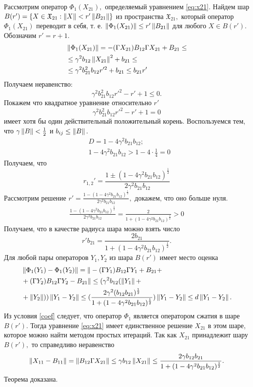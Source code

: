 Рассмотрим оператор $\Phi_1(X_{21}),$ определяемый уравнением \eqref{eq:x21}. Найдем шар $B(r') = \{ X \in  \mathfrak{X}_{21}: \left\|X\right\| < r' \left\|B_{21}\right\| \}$ из пространства $ \mathfrak{X}_{21},$ который оператор $\Phi_1(X_{21})$ переводит в себя, т.\! е. $\left\|\Phi_1(X_{21})\right\| \leq r' \left\|B_{21}\right\|$ для любого $X \in B(r').$ Обозначим $r' = r + 1.$
\begin{align*}
&\left\|\Phi_1(X_{21})\right\| = - (\Gamma X_{21})B_{12}\Gamma X_{21} + B_{21} \leq \\
&\leq \gamma^2 b_{12}\left\|X_{21}\right\|^2 + b_{21} \leq \\ 
&\leq \gamma^2 b_{21}^2 b_{12}r'^2 + b_{21} \leq b_{21}r'
\end{align*}
Получаем неравенство:
$$
\gamma^2 b_{21}^2 b_{12}r'^2 - r' + 1 \leq 0.
$$
Покажем что квадратное уравнение относительно $r'$
$$
\gamma^2 b_{21}^2 b_{12}r'^2 - r' + 1 = 0
$$
имеет хотя бы один действительный положительный корень. Воспользуемся тем, что $\gamma\left\|B\right\| < \frac{1}{2}$ и $b_{ij} \leq \left\|B\right\|.$
\begin{align*}
&D = 1 - 4\gamma^2 b_{21}b_{12}; \\
&1 - 4\gamma^2 b_{21}b_{12} > 1 - 4\cdot\frac{1}{4} = 0
\end{align*}
Получаем, что 
$$
	r_{1,2}' = \frac{1 \pm (1 - 4\gamma^2 b_{21}b_{12})^{\frac{1}{2}}}{2\gamma^2 b_{21}b_{12}}
$$	
Рассмотрим решение $r' = \frac{1 - (1 - 4\gamma^2 b_{21}b_{12})^{\frac{1}{2}}}{2\gamma^2 b_{21}b_{12}},$ докажем, что оно больше нуля.
\begin{align*}
\frac{1 - (1 - 4\gamma^2 b_{21}b_{12})^{\frac{1}{2}}}{2\gamma^2 b_{21}b_{12}} = \frac{2}{1 + (1 - 4\gamma^2 b_{21}b_{12})^{\frac{1}{2}}} > 0
\end{align*}
Получаем, что в качестве радиуса шара можно взять число
$$
 r' b_{21} = \frac{2b_{21}}{1 + (1 - 4\gamma^2 b_{21}b_{12})^{\frac{1}{2}}}.
$$
Для любой пары операторов $Y_1, Y_2$ из шара $B(r')$ имеет место оценка
\begin{align*}
&\left\|\Phi_1(Y_1) - \Phi_1(Y_2)\right\| = \|- (\Gamma Y_1)B_{12}\Gamma Y_1 + B_{21} + \\
& + (\Gamma Y_2)B_{12}\Gamma Y_2 - B_{21}\| \leq (\gamma^2 b_{12}(\left\|Y_1\right\| + \\
& + \left\|Y_2\right\|))\left\|Y_1 - Y_2\right\| \leq (\frac{2\gamma^2 (b_{12}b_{21})^{\frac{1}{2}}}{1 + (1 - 4\gamma^2 b_{21}b_{12})^{\frac{1}{2}}})\left\|Y_1 - Y_2\right\| \leq d\left\|Y_1 - Y_2\right\|.
\end{align*}
Из условия \eqref{coef} следует, что оператор $\Phi_1$ является оператором сжатия в шаре $B(r').$ Тогда уравнение \eqref{eq:x21} имеет единственное решение $X_{21}$ в этом шаре, которое можно найти методом простых итераций. Так как $X_{21}$ принадлежит шару $B(r'),$ то справедливо неравенство
\begin{align*}
\left\|X_{11} - B_{11}\right\| = \left\|B_{12}\Gamma X_{21}\right\| \leq \gamma b_{12} \left\|X_{21}\right\| \leq \frac{2\gamma b_{12}b_{21}}{1 + (1 - 4\gamma^2 b_{21}b_{12})^{\frac{1}{2}}}.
\end{align*}
Теорема доказана.

